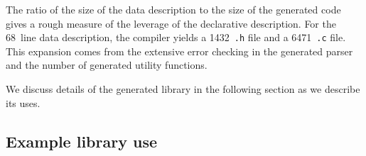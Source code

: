 The ratio of the size of the data description to the size of the generated code gives a rough measure of the leverage of the
declarative description.  For the 
68~line \dibbler{} data description, the compiler yields a 1432~\texttt{.h} file
and a 6471~\texttt{.c} file.  This expansion comes from the extensive error checking in the generated parser and the number of generated utility functions.

We discuss details of the generated library in the following section
as we describe its uses.


\subsection{Example library use}
\label{sec:example:library-use}